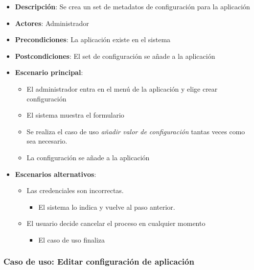 \documentclass[12pt,a4paperpaper,]{report}
\providecommand{\tightlist}{%
  \setlength{\itemsep}{0pt}\setlength{\parskip}{0pt}}
\begin{document}
\begin{itemize}
\tightlist
\item
  \textbf{Descripción}: Se crea un set de metadatos de configuración
  para la aplicación
\item
  \textbf{Actores}: Administrador
\item
  \textbf{Precondiciones}: La aplicación existe en el sistema
\item
  \textbf{Postcondiciones}: El set de configuración se añade a la
  aplicación
\item
  \textbf{Escenario principal}:

  \begin{itemize}
  \tightlist
  \item
    El administrador entra en el menú de la aplicación y elige crear
    configuración
  \item
    El sistema muestra el formulario
  \item
    Se realiza el caso de uso \emph{añadir valor de configuración}
    tantas veces como sea necesario.
  \item
    La configuración se añade a la aplicación
  \end{itemize}
\item
  \textbf{Escenarios alternativos}:

  \begin{itemize}
  \tightlist
  \item
    Las credenciales son incorrectas.

    \begin{itemize}
    \tightlist
    \item
      El sistema lo indica y vuelve al paso anterior.
    \end{itemize}
  \item
    El usuario decide cancelar el proceso en cualquier momento

    \begin{itemize}
    \tightlist
    \item
      El caso de uso finaliza
    \end{itemize}
  \end{itemize}
\end{itemize}

\subsubsection{Caso de uso: Editar configuración de
aplicación}\label{caso-de-uso-editar-configuraciuxf3n-de-aplicaciuxf3n}
\end{document}
